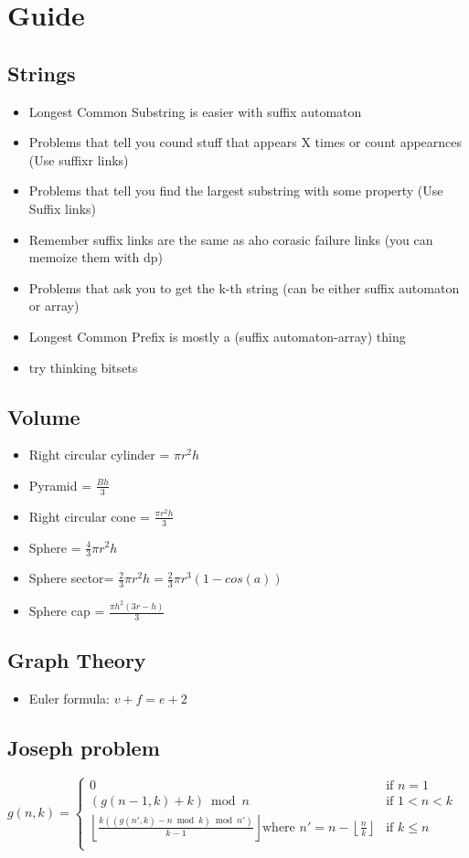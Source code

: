 \section{Guide}
\subsection{Strings}
\begin{itemize}
\item Longest Common Substring is easier with suffix automaton 
\item Problems that tell you cound stuff that appears X times or count appearnces (Use suffixr links)
\item Problems that tell you find the largest substring with some property (Use Suffix links)
\item Remember suffix links are the same as aho corasic failure links (you can memoize them with dp)
\item Problems that ask you to get the k-th string (can be either suffix automaton or array)
\item Longest Common Prefix is mostly a (suffix automaton-array) thing
\item try thinking bitsets
\end{itemize}
\hrulefill 
\subsection{Volume}
\begin{itemize}
\item Right circular cylinder = $\pi r^2 h$ 
\item Pyramid = $\frac{Bh}{3}$
\item Right circular cone = $\frac{\pi r^2 h}{3}$
\item Sphere = $\frac{4}{3} \pi r^2 h$
\item Sphere sector= $\frac{2}{3} \pi r^2h = \frac{2}{3} \pi r^3 (1-cos(a))$
\item Sphere cap = $\frac{\pi h^2 (3r-h)}{3}$
\end{itemize}
\hrulefill
\subsection{Graph Theory}
\begin{itemize}
\item Euler formula: $v+f = e+2$
\end{itemize}
\hrulefill
\subsection{Joseph problem}
${\displaystyle g(n,k)={\begin{cases}
 0 & {\text{if }}n=1\\
 (g(n-1,k)+k){\bmod {n}}&{\text{if }} 1<n<k\\
 \left\lfloor {\frac {k((g(n',k)-n{\bmod {k}}){\bmod {n}}')}{k-1}}\right\rfloor {\text{where }}n'=n-\left\lfloor {\frac {n}{k}}\right\rfloor &{\text{if }}k\leq n\\
 \end{cases}}}$\\
\hrulefill